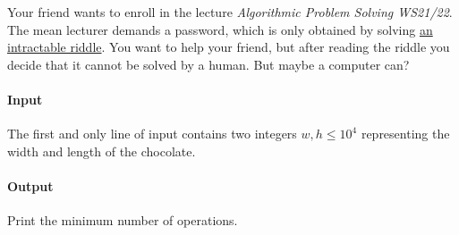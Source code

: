 



\makeheader

Your friend wants to enroll in the lecture \emph{Algorithmic Problem Solving WS21/22}.
The mean lecturer demands a password, which is only obtained by solving \href{https://hpi.de/friedrich/teaching/ws21/algoriddles.html}{an intractable riddle}.
You want to help your friend, but after reading the riddle you decide that it cannot be solved by a human.
But maybe a computer can?

\paragraph*{Input}

The first and only line of input contains two integers $w,h\leq10^4$ representing the width and length of the chocolate.

\paragraph*{Output}

Print the minimum number of operations.

\begin{samples}
\end{samples}


